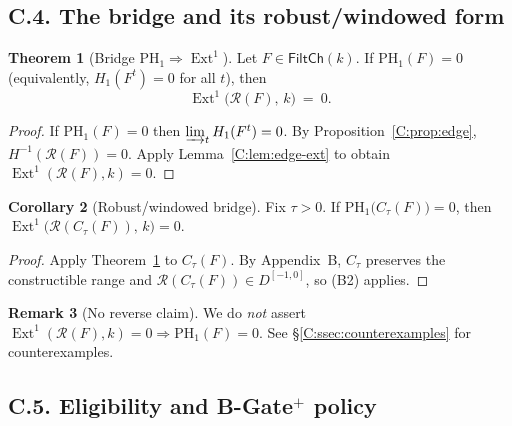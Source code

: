 \documentclass[11pt]{article}
\numberwithin{equation}{section}
\theoremstyle{plain}
\theoremstyle{definition}
\theoremstyle{remark}
\DeclareMathOperator{\Ext}{Ext}
\theoremstyle{plain}
\theoremstyle{definition}
\numberwithin{equation}{section}
\newtheorem{theorem}{Theorem}[section]
\newtheorem{corollary}[theorem]{Corollary}
\theoremstyle{definition}
\newtheorem{remark}[theorem]{Remark}
\numberwithin{equation}{section}
\theoremstyle{plain}
\theoremstyle{definition}
\theoremstyle{remark}
\begin{document}
\subsection*{C.4. The bridge and its robust/windowed form}

\begin{theorem}[Bridge \(\mathrm{PH}_1\Rightarrow \Ext^1\)]\label{C:thm:bridge}
Let \(F\in \mathsf{FiltCh}(k)\).
If \(\mathrm{PH}_1(F)=0\) (equivalently, \(H_1(F^t)=0\) for all \(t\)), then
\[
\Ext^1\!\big(\mathcal{R}(F),\,k\big)\ =\ 0.
\]
\end{theorem}

\begin{proof}
If \(\mathrm{PH}_1(F)=0\) then \(\varinjlim_t H_1(F^t)=0\).
By Proposition~\ref{C:prop:edge}, \(H^{-1}(\mathcal{R}(F))=0\).
Apply Lemma~\ref{C:lem:edge-ext} to obtain \(\Ext^1(\mathcal{R}(F),k)=0\).
\end{proof}

\begin{corollary}[Robust/windowed bridge]\label{C:cor:windowed}
Fix \(\tau>0\).
If \(\mathrm{PH}_1\!\big(C_\tau(F)\big)=0\), then \(\Ext^1\!\big(\mathcal{R}(C_\tau(F)),\,k\big)=0\).
\end{corollary}

\begin{proof}
Apply Theorem~\ref{C:thm:bridge} to \(C_\tau(F)\).
By Appendix~B, \(C_\tau\) preserves the constructible range and \(\mathcal{R}(C_\tau(F))\in D^{[-1,0]}\), so \textup{(B2)} applies.
\end{proof}

\begin{remark}[No reverse claim]\label{C:rk:no-reverse}
We do \emph{not} assert \(\Ext^1(\mathcal{R}(F),k)=0 \Rightarrow \mathrm{PH}_1(F)=0\).
See \S\ref{C:ssec:counterexamples} for counterexamples.
\end{remark}

\subsection*{C.5. Eligibility and B-Gate\texorpdfstring{$^{+}$}{+} policy}
\end{document}
